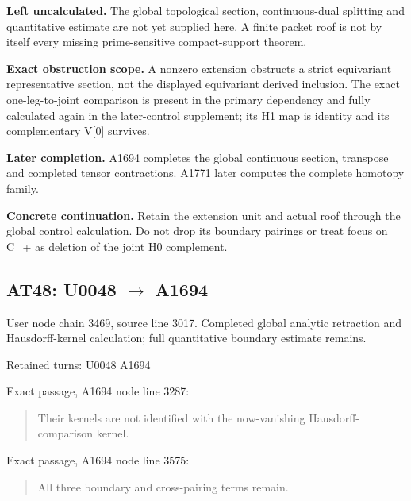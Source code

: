 \textbf{Left uncalculated.} The global topological section,
continuous-dual splitting and quantitative estimate are not yet supplied
here. A finite packet roof is not by itself every missing
prime-sensitive compact-support theorem.

\textbf{Exact obstruction scope.} A nonzero extension obstructs a strict
equivariant representative section, not the displayed equivariant
derived inclusion. The exact one-leg-to-joint comparison is present in
the primary dependency and fully calculated again in the later-control
supplement; its H1 map is identity and its complementary V{[}0{]}
survives.

\textbf{Later completion.} A1694 completes the global continuous
section, transpose and completed tensor contractions. A1771 later
computes the complete homotopy family.

\textbf{Concrete continuation.} Retain the extension unit and actual
roof through the global control calculation. Do not drop its boundary
pairings or treat focus on C\_+ as deletion of the joint H0 complement.

\subsection{\texorpdfstring{AT48: U0048
\allowbreak{}\ensuremath{→}\allowbreak{}
A1694}{AT48: U0048  A1694}}\label{TranscriptLedgerStage:at48-u0048-a1694}

User node \protect{} chain
3469, source line 3017. Completed global analytic retraction and
Hausdorff-kernel calculation; full quantitative boundary estimate
remains.

Retained turns: U0048
\protect{} A1694
\protect{}

Exact passage, A1694 node
\protect{} line 3287:

\begin{quote}
Their kernels are not identified with the now-vanishing
Hausdorff-comparison kernel.
\end{quote}

Exact passage, A1694 node
\protect{} line 3575:

\begin{quote}
All three boundary and cross-pairing terms remain.
\end{quote}

